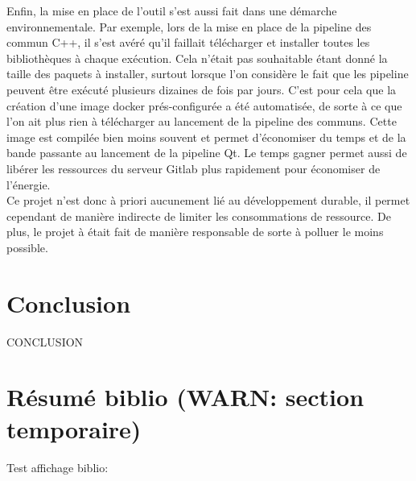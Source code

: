 \documentclass[a4paper]{article}
\begin{document}
Enfin, la mise en place de l'outil s'est aussi fait dans une démarche
environnementale. Par exemple, lors de la mise en place de la pipeline des
commun C++, il s'est avéré qu'il faillait télécharger et installer toutes les
bibliothèques à chaque exécution. Cela n'était pas souhaitable étant donné la
taille des paquets à installer, surtout lorsque l'on considère le fait que les
pipeline peuvent être exécuté plusieurs dizaines de fois par jours. C'est pour
cela que la création d'une image docker prés-configurée a été automatisée, de
sorte à ce que l'on ait plus rien à télécharger au lancement de la pipeline des
communs. Cette image est compilée bien moins souvent et permet d'économiser du
temps et de la bande passante au lancement de la pipeline Qt. Le temps gagner
permet aussi de libérer les ressources du serveur Gitlab plus rapidement pour
économiser de l'énergie.\\

Ce projet n'est donc à priori aucunement lié au développement durable, il permet
cependant de manière indirecte de limiter les consommations de ressource. De
plus, le projet à était fait de manière responsable de sorte à polluer le moins
possible.

\clearpage
\section*{Conclusion}

CONCLUSION



\section{Résumé biblio (WARN: section temporaire)}

Test affichage biblio:
\end{document}
